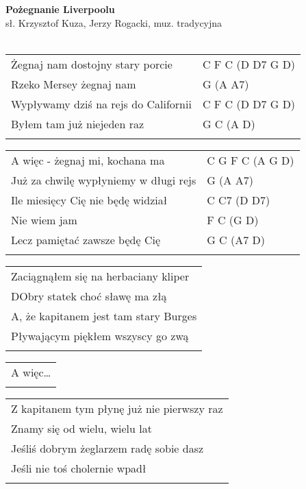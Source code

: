 \documentclass[a5paper]{article}
\begin{document}


\noindent
\fontsize{12pt}{15pt}\selectfont
\textbf{Pożegnanie Liverpoolu} \\
\fontsize{8pt}{10pt}\selectfont
sł. Krzysztof Kuza, Jerzy Rogacki, muz. tradycyjna \\ \\
\fontsize{10pt}{12pt}\selectfont
{}
\begin{tabular}{@{}p{7.50cm}p{3cm}@{}}
\noindent
Żegnaj nam dostojny stary porcie & C F C (D D7 G D) \\
Rzeko Mersey żegnaj nam & G (A A7) \\
Wypływamy dziś na rejs do Californii & C F C (D D7 G D) \\
Byłem tam już niejeden raz & G C (A D) \\ \\
\end{tabular}

\noindent
\begin{tabular}{@{}p{6.50cm}p{3cm}@{}}
A więc - żegnaj mi, kochana ma & C G F C (A G D) \\
Już za chwilę wypłyniemy w długi rejs & G (A A7) \\
Ile miesięcy Cię nie będę widział & C C7 (D D7) \\
Nie wiem jam & F C (G D) \\
Lecz pamiętać zawsze będę Cię & G C (A7 D) \\ \\
\end{tabular}

\noindent
\begin{tabular}{@{}p{8.50cm}@{}}
Zaciągnąłem się na herbaciany kliper \\
DObry statek choć sławę ma złą \\
A, że kapitanem jest tam stary Burges \\
Pływającym piękłem wszyscy go zwą \\ \\
\end{tabular}

\noindent
\begin{tabular}{@{}p{7.50cm}@{}}
A więc… \\ \\
\end{tabular}

\noindent
\begin{tabular}{@{}p{8.50cm}@{}}
Z kapitanem tym płynę już nie pierwszy raz \\
Znamy się od wielu, wielu lat \\
Jeśliś dobrym żeglarzem radę sobie dasz \\
Jeśli nie toś cholernie wpadł \\ \\
\end{tabular}
\end{document}
